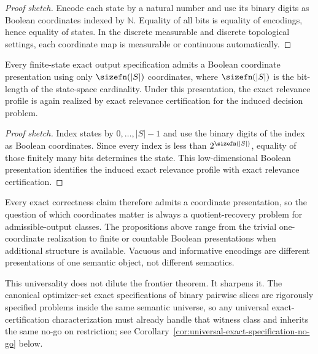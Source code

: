 \begin{proof}[Proof sketch]
Encode each state by a natural number and use its binary digits as Boolean coordinates indexed by $\mathbb{N}$. Equality of all bits is equality of encodings, hence equality of states. In the discrete measurable and discrete topological settings, each coordinate map is measurable or continuous automatically.
\end{proof}

\begin{proposition}\label{prop:finite-specifications-admit-low-dimensional-boolean-presentations}
Every finite-state exact output specification admits a Boolean coordinate presentation using only $\sizefn(|S|)$ coordinates, where $\sizefn(|S|)$ is the bit-length of the state-space cardinality. Under this presentation, the exact relevance profile is again realized by exact relevance certification for the induced decision problem.
\end{proposition}

\begin{proof}[Proof sketch]
Index states by $0,\dots,|S|-1$ and use the binary digits of the index as Boolean coordinates. Since every index is less than $2^{\sizefn(|S|)}$, equality of those finitely many bits determines the state. This low-dimensional Boolean presentation identifies the induced exact relevance profile with exact relevance certification.
\end{proof}

Every exact correctness claim therefore admits a coordinate presentation, so the question of which coordinates matter is always a quotient-recovery problem for admissible-output classes. The propositions above range from the trivial one-coordinate realization to finite or countable Boolean presentations when additional structure is available. Vacuous and informative encodings are different presentations of one semantic object, not different semantics.

This universality does not dilute the frontier theorem. It sharpens it. The canonical optimizer-set exact specifications of binary pairwise slices are rigorously specified problems inside the same semantic universe, so any universal exact-certification characterization must already handle that witness class and inherits the same no-go on restriction; see Corollary~\ref{cor:universal-exact-specification-no-go} below.

